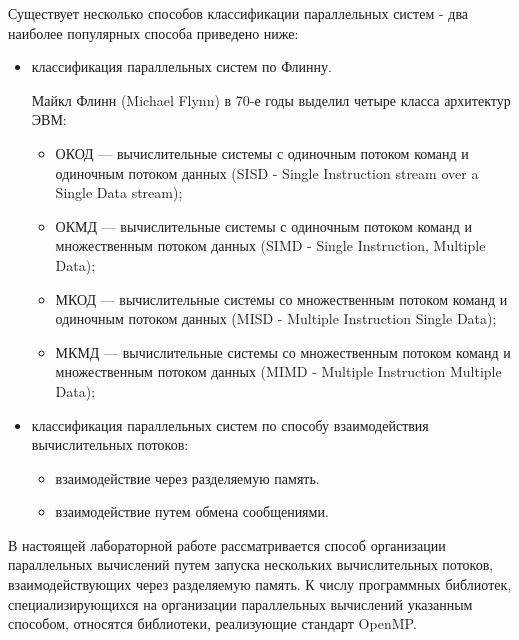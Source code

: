 Существует несколько способов классификации параллельных систем - два наиболее популярных способа приведено ниже:

\begin{itemize}

	\item классификация параллельных систем по Флинну.

	Майкл Флинн (Michael Flynn) в 70-е годы выделил четыре класса архитектур ЭВМ:

	\begin{itemize}
	
		\item ОКОД — вычислительные системы с одиночным потоком команд и одиночным потоком данных (SISD - Single Instru\-ction stream over a Single Data stream);
		\item ОКМД — вычислительные системы с одиночным потоком команд и множественным потоком данных (SIMD - Single Instruction, Mu\-ltiple Data);
		\item МКОД — вычислительные системы со множественным потоком команд и одиночным потоком данных (MISD - Multiple Instruction Single Data);
		\item МКМД — вычислительные системы со множественным потоком команд и множественным потоком данных (MIMD - Multiple Instruction Multiple Data);

	\end{itemize}

	\item классификация параллельных систем по способу взаимодействия вычислительных потоков:

	\begin{itemize}

		\item взаимодействие через разделяемую память.
		\item взаимодействие путем обмена сообщениями.

	\end{itemize}

\end{itemize}

В настоящей лабораторной работе рассматривается способ организации параллельных вычислений путем запуска нескольких вычислительных потоков, взаимодействующих через разделяемую память. К числу программных библиотек, специализирующихся на организации параллельных вычислений указанным способом, относятся библиотеки, реализующие стандарт OpenMP.


